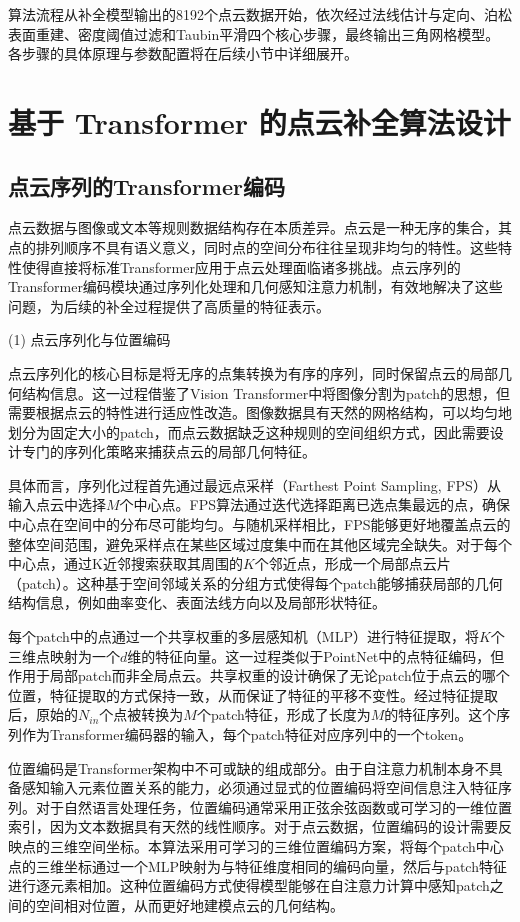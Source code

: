 算法流程从补全模型输出的8192个点云数据开始，依次经过法线估计与定向、泊松表面重建、密度阈值过滤和Taubin平滑四个核心步骤，最终输出三角网格模型。各步骤的具体原理与参数配置将在后续小节中详细展开。

\section{基于 Transformer 的点云补全算法设计}

\subsection{点云序列的Transformer编码}

点云数据与图像或文本等规则数据结构存在本质差异。点云是一种无序的集合，其点的排列顺序不具有语义意义，同时点的空间分布往往呈现非均匀的特性。这些特性使得直接将标准Transformer应用于点云处理面临诸多挑战。点云序列的Transformer编码模块通过序列化处理和几何感知注意力机制，有效地解决了这些问题，为后续的补全过程提供了高质量的特征表示。

(1) 点云序列化与位置编码

点云序列化的核心目标是将无序的点集转换为有序的序列，同时保留点云的局部几何结构信息。这一过程借鉴了Vision Transformer\cite{dosovitskiy2021vit}中将图像分割为patch的思想，但需要根据点云的特性进行适应性改造。图像数据具有天然的网格结构，可以均匀地划分为固定大小的patch，而点云数据缺乏这种规则的空间组织方式，因此需要设计专门的序列化策略来捕获点云的局部几何特征。

具体而言，序列化过程首先通过最远点采样（Farthest Point Sampling, FPS）从输入点云中选择$M$个中心点。FPS算法通过迭代选择距离已选点集最远的点，确保中心点在空间中的分布尽可能均匀。与随机采样相比，FPS能够更好地覆盖点云的整体空间范围，避免采样点在某些区域过度集中而在其他区域完全缺失。对于每个中心点，通过K近邻搜索获取其周围的$K$个邻近点，形成一个局部点云片（patch）。这种基于空间邻域关系的分组方式使得每个patch能够捕获局部的几何结构信息，例如曲率变化、表面法线方向以及局部形状特征。

每个patch中的点通过一个共享权重的多层感知机（MLP）进行特征提取，将$K$个三维点映射为一个$d$维的特征向量。这一过程类似于PointNet\cite{qi2017pointnet}中的点特征编码，但作用于局部patch而非全局点云。共享权重的设计确保了无论patch位于点云的哪个位置，特征提取的方式保持一致，从而保证了特征的平移不变性。经过特征提取后，原始的$N_{in}$个点被转换为$M$个patch特征，形成了长度为$M$的特征序列。这个序列作为Transformer编码器的输入，每个patch特征对应序列中的一个token。

位置编码是Transformer架构中不可或缺的组成部分。由于自注意力机制本身不具备感知输入元素位置关系的能力，必须通过显式的位置编码将空间信息注入特征序列。对于自然语言处理任务，位置编码通常采用正弦余弦函数或可学习的一维位置索引，因为文本数据具有天然的线性顺序。对于点云数据，位置编码的设计需要反映点的三维空间坐标。本算法采用可学习的三维位置编码方案，将每个patch中心点的三维坐标通过一个MLP映射为与特征维度相同的编码向量，然后与patch特征进行逐元素相加。这种位置编码方式使得模型能够在自注意力计算中感知patch之间的空间相对位置，从而更好地建模点云的几何结构。

